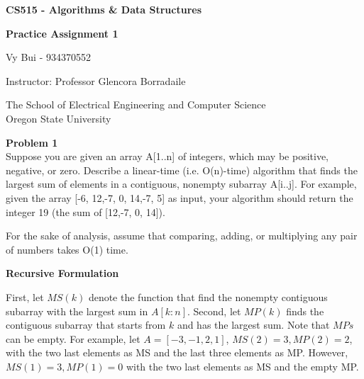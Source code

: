 \documentclass[12pt,article]{article}
\newenvironment{problem}[2][Problem]
    { \begin{mdframed}[backgroundcolor=gray!20] \textbf{#1 #2} \\}
    {  \end{mdframed}}
\begin{document}
\begin{titlepage}
    \begin{center}
        \vspace*{4cm}

        \textbf{\Large CS515 - Algorithms \& Data Structures}

        \vspace{0.5cm}
 
        \textbf{\Large Practice Assignment 1}
 
        \vspace{1cm}

        Vy Bui - 934370552

        \vspace{2cm}

        Instructor: Professor Glencora Borradaile
        \vfill
             
        \vspace{0.8cm}
      
             
        The School of Electrical Engineering and Computer Science\\
        Oregon State University\\
             
    \end{center}
\end{titlepage}

\begin{problem}{1} 
Suppose you are given an array A[1..n] of integers, which may be positive, negative, or zero. Describe a linear-time (i.e. O(n)-time) algorithm that finds the largest sum of elements in a contiguous, nonempty subarray A[i..j]. For example, given the array [-6, 12,-7, 0, 14,-7, 5] as input, your algorithm should return the integer 19 (the sum of [12,-7, 0, 14]).

For the sake of analysis, assume that comparing, adding, or multiplying any pair of numbers takes O(1) time.

\end{problem}

\textbf{Recursive Formulation}

First, let $MS(k)$ denote the function that find the nonempty contiguous subarray with the largest sum in $A[k:n]$. Second, let $MP(k)$ finds the contiguous subarray that starts from $k$ and has the largest sum. Note that $MPs$ can be empty. For example, let $A = [-3,-1,2,1]$, $MS(2) = 3, MP(2) = 2$, with the two last elements as MS and the last three elements as MP. However, $MS(1) = 3, MP(1) = 0$ with the two last elements as MS and the empty MP.
\end{document}
